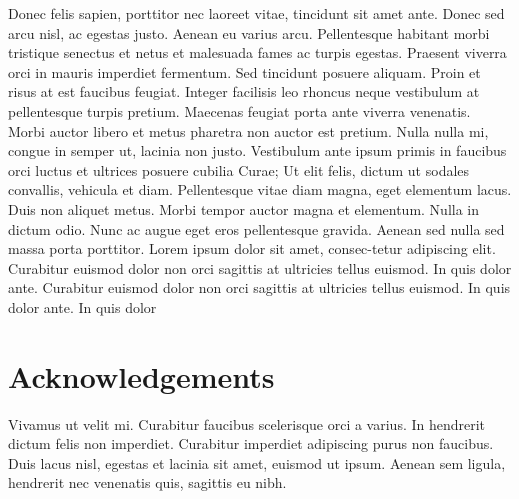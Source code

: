 \documentclass[colTwo]{IIR}
\theoremstyle{definition}
\begin{document}
Donec felis sapien, porttitor nec laoreet vitae, tincidunt sit amet ante. Donec sed arcu nisl, ac egestas justo. Aenean eu varius arcu. Pellentesque habitant morbi tristique senectus et netus et malesuada fames ac turpis egestas. Praesent viverra orci in mauris imperdiet fermentum. Sed tincidunt posuere aliquam. Proin et risus at est faucibus feugiat. Integer facilisis leo rhoncus neque vestibulum at pellentesque turpis pretium. Maecenas feugiat porta ante viverra venenatis. Morbi auctor libero et metus pharetra non auctor est pretium. Nulla nulla mi, congue in semper ut, lacinia non justo. Vestibulum ante ipsum primis in faucibus orci luctus et ultrices posuere cubilia Curae; Ut elit felis, dictum ut sodales convallis, vehicula et diam. Pellentesque vitae diam magna, eget elementum lacus. Duis non aliquet metus. Morbi tempor auctor magna et elementum. Nulla in dictum odio. Nunc ac augue eget eros pellentesque gravida. Aenean sed nulla sed massa porta porttitor. Lorem ipsum dolor sit amet, consec-tetur adipiscing elit. Curabitur euismod dolor non orci sagittis at ultricies tellus euismod. In quis dolor ante. Curabitur euismod dolor non orci sagittis at ultricies tellus euismod. In quis dolor ante. In quis dolor 


\section{Acknowledgements}
Vivamus ut velit mi. Curabitur faucibus scelerisque orci a varius. In hendrerit dictum felis non imperdiet. Curabitur imperdiet adipiscing purus non faucibus. Duis lacus nisl, egestas et lacinia sit amet, euismod ut ipsum. Aenean sem ligula, hendrerit nec venenatis quis, sagittis eu nibh. 
\end{document}
